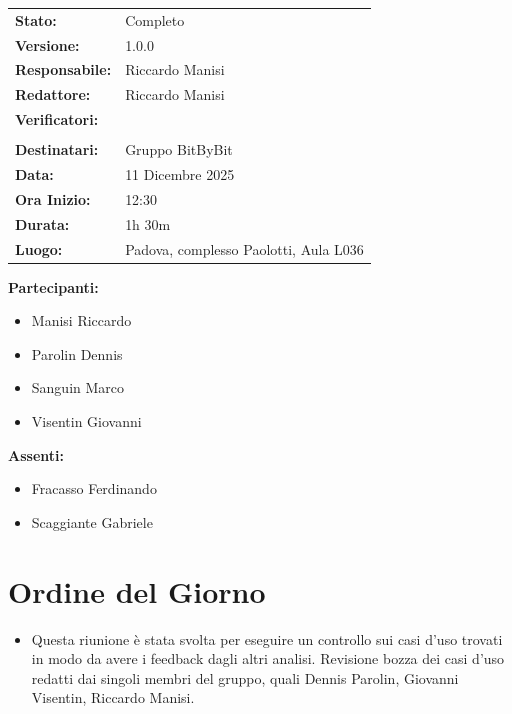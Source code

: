 \documentclass[a4paper,12pt]{article}
\begin{document}
\begin{tcolorbox}
\begin{tabularx}{\textwidth}{@{}l X@{}}
\textbf{Stato:} & Completo \\
\textbf{Versione:} & 1.0.0 \\
\textbf{Responsabile:} & Riccardo Manisi\\
\textbf{Redattore:} & Riccardo Manisi \\
\textbf{Verificatori:} &
\begin{tabular}[t]{@{}l@{}}
Giovanni Visentin \\
\end{tabular} \\
\textbf{Destinatari:} & Gruppo BitByBit \\
\textbf{Data:} & 11 Dicembre 2025 \\
\textbf{Ora Inizio:} & 12:30 \\
\textbf{Durata:} & 1h 30m \\
\textbf{Luogo:} & Padova, complesso Paolotti, Aula L036 \\
\end{tabularx}
\end{tcolorbox}

\vspace{0.4cm}
\textbf{Partecipanti:}  
\begin{itemize}
    \item Manisi Riccardo
    \item Parolin Dennis
    \item Sanguin Marco
    \item Visentin Giovanni 
\end{itemize} 

\textbf{Assenti:} 
\begin{itemize}
    \item Fracasso Ferdinando
    \item Scaggiante Gabriele
\end{itemize} 

\vspace*{\fill} %

\clearpage

\clearpage
\tableofcontents
\thispagestyle{empty} %
\clearpage

\section{Ordine del Giorno}
\begin{itemize}
    \item Questa riunione è stata svolta per eseguire un controllo sui casi d'uso trovati in modo da avere i feedback dagli altri analisi. Revisione bozza dei casi d'uso redatti dai singoli membri del gruppo, quali Dennis Parolin, Giovanni Visentin, Riccardo Manisi. 
\end{itemize}
\end{document}
